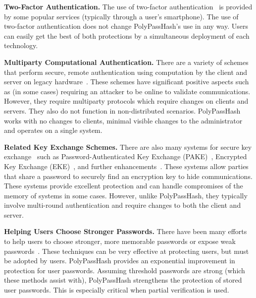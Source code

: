 {\bf Two-Factor Authentication.}
The use of two-factor authentication~\cite{di2005two} is provided by some 
popular services (typically through a user's smartphone).   The use of 
two-factor authentication does not
change PolyPassHash's use in any way.   Users can easily get the best of both
protections by a simultaneous deployment of each technology.



{\bf Multiparty Computational Authentication.}
There are a variety of schemes that perform secure, remote authentication using
computation by the client and server on legacy hardware~\cite{wu1998secure,
Lomas_SOSP_89, chien2001modified, jan1998paramita, gong1995optimal, 
camenisch2010credential, brainard2003nightingale,
katz2001efficient, katz2003forward, gong1993protecting}.  These schemes have 
significant positive aspects such as (in some cases) requiring an attacker to 
be online to validate communications.   However, they require multiparty 
protocols which require changes on clients and servers.   They also do not 
function in non-distributed scenarios.   PolyPassHash works with no 
changes to clients, minimal visible changes to the administrator and
operates on a single system.


{\bf Related Key Exchange Schemes.}
There are also many systems for secure key exchange~\cite{shoup1999formal} 
such as Pass\-word-Au\-then\-ti\-cated Key Exchange
(PAKE)~\cite{boyko2000provably, shen2010towards,sathik2010secret, 
jablon1996strong}, Encrypted Key Exchange (EKE)~\cite{steiner1995refinement,
lucks1998open, jablon1997extended}, and further 
enhancements~\cite{wang2005strengthening}.   These 
systems allow parties that
share a password to securely find an encryption key to hide communications.   
These systems provide excellent protection and can handle compromises
of the memory of systems in some cases.   However, unlike PolyPassHash, they 
typically involve multi-round authentication and require changes to both the 
client and server.   

%


{\bf Helping Users Choose Stronger Passwords.}
There have been many efforts to help users to choose stronger,
more memorable passwords or expose weak 
passwords~\cite{topkara2007passwords,klein1990foiling,bishop1995improving,
schechter2010popularity,
komanduri2011passwords, shay2010encountering, xkcdpassword}.   These 
techniques can be very effective at protecting users,
but must be adopted by users.
PolyPassHash provides an exponential improvement in protection for user 
passwords.   Assuming threshold passwords are strong
(which these methods assist with), PolyPassHash strengthens the
protection of stored user passwords.   This is especially critical when
partial verification is used.

